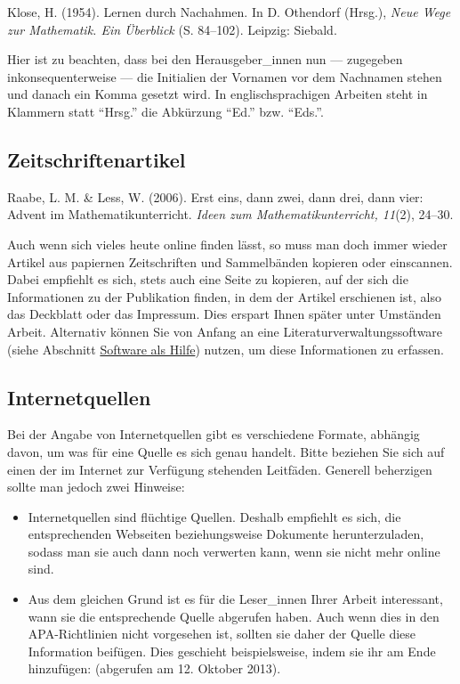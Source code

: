 \documentclass[ngerman,bibliography=totoc,oneside,12pt,a4paper]{scrbook}
\begin{document}
Klose, H. (1954). Lernen durch Nachahmen. In D.
Othendorf (Hrsg.), \emph{Neue Wege zur Mathematik. Ein Überblick} (S.
84--102). Leipzig: Siebald.

Hier ist zu beachten, dass bei den Herausgeber\_innen nun --- zugegeben
inkonsequenterweise --- die Initialien der Vornamen vor dem Nachnamen
stehen und danach ein Komma gesetzt wird. In englischsprachigen Arbeiten
steht in Klammern statt \enquote{Hrsg.} die Abkürzung \enquote{Ed.} bzw.
\enquote{Eds.}.

\subsection*{Zeitschriftenartikel}\label{zeitschriftenartikel}

Raabe, L. M. \& Less, W. (2006). Erst eins, dann
zwei, dann drei, dann vier: Advent im Mathematikunterricht. \emph{Ideen
zum Mathematikunterricht, 11}(2), 24--30.

Auch wenn sich vieles heute online finden lässt, so muss man doch immer
wieder Artikel aus papiernen Zeitschriften und Sammelbänden kopieren
oder einscannen. Dabei empfiehlt es sich, stets auch eine Seite zu
kopieren, auf der sich die Informationen zu der Publikation finden, in
dem der Artikel erschienen ist, also das Deckblatt oder das Impressum.
Dies erspart Ihnen später unter Umständen Arbeit. Alternativ können Sie
von Anfang an eine Literaturverwaltungssoftware (siehe Abschnitt
\protect\hyperlink{sec:software}{Software als Hilfe}) nutzen, um diese
Informationen zu erfassen.

\subsection*{Internetquellen}\label{internetquellen}

Bei der Angabe von Internetquellen gibt es verschiedene Formate,
abhängig davon, um was für eine Quelle es sich genau handelt. Bitte
beziehen Sie sich auf einen der im Internet zur Verfügung stehenden
Leitfäden. Generell beherzigen sollte man jedoch zwei Hinweise:

\begin{itemize}
\item
  Internetquellen sind flüchtige Quellen. Deshalb empfiehlt es sich, die
  entsprechenden Webseiten beziehungsweise Dokumente herunterzuladen,
  sodass man sie auch dann noch verwerten kann, wenn sie nicht mehr
  online sind.
\item
  Aus dem gleichen Grund ist es für die Leser\_innen Ihrer Arbeit
  interessant, wann sie die entsprechende Quelle abgerufen haben. Auch
  wenn dies in den APA-Richtlinien nicht vorgesehen ist, sollten sie
  daher der Quelle diese Information beifügen. Dies geschieht
  beispielsweise, indem sie ihr am Ende hinzufügen: (abgerufen am 12.
  Oktober 2013).
\end{itemize}
\end{document}
